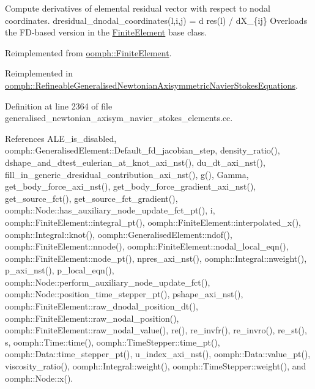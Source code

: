 Compute derivatives of elemental residual vector with respect to nodal coordinates. dresidual\+\_\+dnodal\+\_\+coordinates(l,i,j) = d res(l) / d\+X\+\_\+\{ij\} Overloads the F\+D-\/based version in the \hyperlink{classoomph_1_1FiniteElement}{Finite\+Element} base class. 

Reimplemented from \hyperlink{classoomph_1_1FiniteElement_ae4b85a31a983a52d3010930f9e0851b8}{oomph\+::\+Finite\+Element}.



Reimplemented in \hyperlink{classoomph_1_1RefineableGeneralisedNewtonianAxisymmetricNavierStokesEquations_a6f99de802883fc8b4cf3fbcbf3e342d0}{oomph\+::\+Refineable\+Generalised\+Newtonian\+Axisymmetric\+Navier\+Stokes\+Equations}.



Definition at line 2364 of file generalised\+\_\+newtonian\+\_\+axisym\+\_\+navier\+\_\+stokes\+\_\+elements.\+cc.



References A\+L\+E\+\_\+is\+\_\+disabled, oomph\+::\+Generalised\+Element\+::\+Default\+\_\+fd\+\_\+jacobian\+\_\+step, density\+\_\+ratio(), dshape\+\_\+and\+\_\+dtest\+\_\+eulerian\+\_\+at\+\_\+knot\+\_\+axi\+\_\+nst(), du\+\_\+dt\+\_\+axi\+\_\+nst(), fill\+\_\+in\+\_\+generic\+\_\+dresidual\+\_\+contribution\+\_\+axi\+\_\+nst(), g(), Gamma, get\+\_\+body\+\_\+force\+\_\+axi\+\_\+nst(), get\+\_\+body\+\_\+force\+\_\+gradient\+\_\+axi\+\_\+nst(), get\+\_\+source\+\_\+fct(), get\+\_\+source\+\_\+fct\+\_\+gradient(), oomph\+::\+Node\+::has\+\_\+auxiliary\+\_\+node\+\_\+update\+\_\+fct\+\_\+pt(), i, oomph\+::\+Finite\+Element\+::integral\+\_\+pt(), oomph\+::\+Finite\+Element\+::interpolated\+\_\+x(), oomph\+::\+Integral\+::knot(), oomph\+::\+Generalised\+Element\+::ndof(), oomph\+::\+Finite\+Element\+::nnode(), oomph\+::\+Finite\+Element\+::nodal\+\_\+local\+\_\+eqn(), oomph\+::\+Finite\+Element\+::node\+\_\+pt(), npres\+\_\+axi\+\_\+nst(), oomph\+::\+Integral\+::nweight(), p\+\_\+axi\+\_\+nst(), p\+\_\+local\+\_\+eqn(), oomph\+::\+Node\+::perform\+\_\+auxiliary\+\_\+node\+\_\+update\+\_\+fct(), oomph\+::\+Node\+::position\+\_\+time\+\_\+stepper\+\_\+pt(), pshape\+\_\+axi\+\_\+nst(), oomph\+::\+Finite\+Element\+::raw\+\_\+dnodal\+\_\+position\+\_\+dt(), oomph\+::\+Finite\+Element\+::raw\+\_\+nodal\+\_\+position(), oomph\+::\+Finite\+Element\+::raw\+\_\+nodal\+\_\+value(), re(), re\+\_\+invfr(), re\+\_\+invro(), re\+\_\+st(), s, oomph\+::\+Time\+::time(), oomph\+::\+Time\+Stepper\+::time\+\_\+pt(), oomph\+::\+Data\+::time\+\_\+stepper\+\_\+pt(), u\+\_\+index\+\_\+axi\+\_\+nst(), oomph\+::\+Data\+::value\+\_\+pt(), viscosity\+\_\+ratio(), oomph\+::\+Integral\+::weight(), oomph\+::\+Time\+Stepper\+::weight(), and oomph\+::\+Node\+::x().



